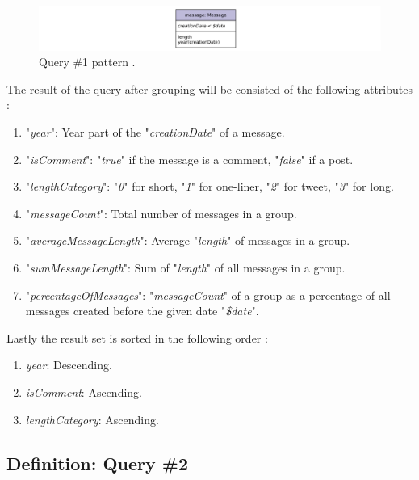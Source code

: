 {\begin{enumerate}
\end{enumerate}

\begin{figure}[H]
\centering
\includegraphics[width=1\textwidth]{pics/Query1.png}
\caption{Query \#1 pattern \cite{prat2017ldbc}.}
\label{fig:Query1}
\end{figure} 


The result of the query after grouping will be consisted of the following attributes \cite{prat2017ldbc}:

\begin{enumerate}
\item "\textit{year}": Year part of the "\textit{creationDate}" of a message.
\item "\textit{isComment}": "\textit{true}" if the message is a comment, "\textit{false}" if a post.
\item "\textit{lengthCategory}": "\textit{0}" for short, "\textit{1}" for one-liner, "\textit{2}" for tweet, "\textit{3}" for long.
\item "\textit{messageCount}": Total number of messages in a group.
\item "\textit{averageMessageLength}": Average "\textit{length}" of messages in a group.
\item "\textit{sumMessageLength}": Sum of "\textit{length}" of all messages in a group.
\item "\textit{percentageOfMessages}": "\textit{messageCount}" of a group as a percentage of all messages created before the given date "\textit{\$date}".

\end{enumerate}

Lastly the result set is sorted in the following order \cite{prat2017ldbc}:

\begin{enumerate}

\item \textit{year}: Descending.
\item \textit{isComment}: Ascending.
\item \textit{lengthCategory}: Ascending.

\end{enumerate}


\subsection{Definition: Query \#2}
\label{subsec:qry2}

}
